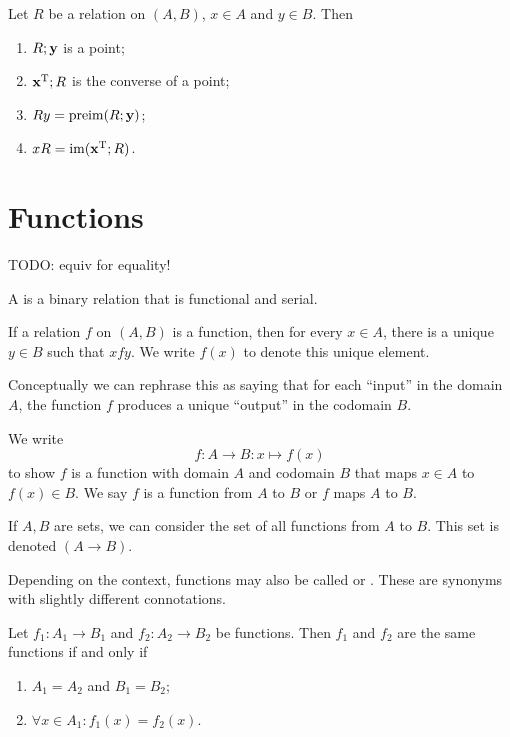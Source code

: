 \begin{lemma}
Let $R$ be a relation on $(A,B)$, $x\in A$ and $y\in B$. Then
\begin{enumerate}
\item $R;\point{y}$ is a point;
\item $\point{x}^\transp; R$ is the converse of a point;
\item $Ry = \preim(R;\point{y})$;
\item $xR = \im(\point{x}^\transp; R)$.
\end{enumerate}
\end{lemma}

\section{Functions}
TODO: equiv for equality!

\begin{definition}
A  is a binary relation that is functional and serial.
\end{definition}
If a relation $f$ on $(A, B)$ is a function, then for every $x\in A$, there is a unique $y\in B$ such that $xfy$. We write $f(x)$ to denote this unique element.

Conceptually we can rephrase this as saying that for each ``input'' in the domain $A$, the function $f$ produces a unique ``output'' in the codomain $B$.

\begin{note}
We write
\[f:A \to B: x\mapsto f(x) \]
to show $f$ is a function with domain $A$ and codomain $B$ that maps $x\in A$ to $f(x)\in B$. We say $f$ is a function from $A$ to $B$ or $f$ maps $A$ to $B$. 

If $A, B$ are sets, we can consider the  set of all functions from $A$ to $B$. This set is denoted $(A\to B)$.
\end{note}

Depending on the context, functions may also be called  or . These are synonyms with slightly different connotations.

\begin{lemma}
Let $f_1: A_1\to B_1$ and $f_2: A_2\to B_2$ be functions. Then $f_1$ and $f_2$ are the same functions \textup{if and only if}
\begin{enumerate}
\item $A_1 = A_2$ and $B_1 = B_2$;
\item $\forall x\in A_1: f_1(x) = f_2(x)$.
\end{enumerate}
\end{lemma}

